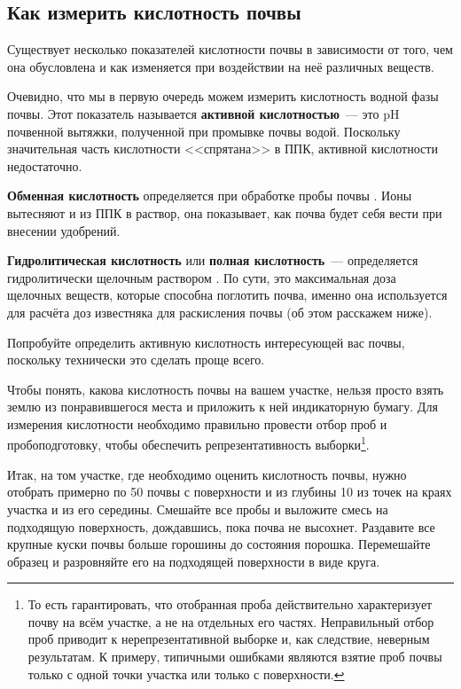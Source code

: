 \subsection*{Как измерить кислотность почвы}

Существует несколько показателей кислотности почвы в зависимости от того, чем она обусловлена и как изменяется при воздействии на неё различных веществ.

Очевидно, что мы в первую очередь можем измерить кислотность водной фазы почвы. Этот показатель называется \textbf{активной кислотностью}~--- это pH почвенной вытяжки, полученной при промывке почвы водой. Поскольку значительная часть кислотности <<спрятана>> в ППК, активной кислотности недостаточно.

\textbf{Обменная кислотность} определяется при обработке пробы почвы . Ионы  вытесняют  и  из ППК в раствор, она показывает, как почва будет себя вести при внесении удобрений.

\textbf{Гидролитическая кислотность} или \textbf{полная кислотность}~--- определяется гидролитически щелочным раствором . По сути, это максимальная доза щелочных веществ, которые способна поглотить почва, именно она используется для расчёта доз известняка для раскисления почвы (об этом расскажем ниже).

Попробуйте определить активную кислотность интересующей вас почвы, поскольку технически это сделать проще всего.

Чтобы понять, какова кислотность почвы на вашем участке, нельзя просто взять землю из понравившегося места и приложить к ней индикаторную бумагу. Для измерения кислотности необходимо правильно провести отбор проб и пробоподготовку, чтобы обеспечить репрезентативность выборки\footnote{То есть гарантировать, что отобранная проба действительно характеризует почву на всём участке, а не на отдельных его частях. Неправильный отбор проб приводит к нерепрезентативной выборке и, как следствие, неверным результатам. К примеру, типичными ошибками являются взятие проб почвы только с одной точки участка или только с поверхности.}.

Итак, на том участке, где необходимо оценить кислотность почвы, нужно отобрать примерно по \qty{50}{\ruG} почвы с поверхности и из глубины \qty{10}{\ruCm} из точек на краях участка и из его середины. Смешайте все пробы и выложите смесь на подходящую поверхность, дождавшись, пока почва не высохнет. Раздавите все крупные куски почвы больше горошины до состояния порошка. Перемешайте образец и разровняйте его на подходящей поверхности в виде круга.

